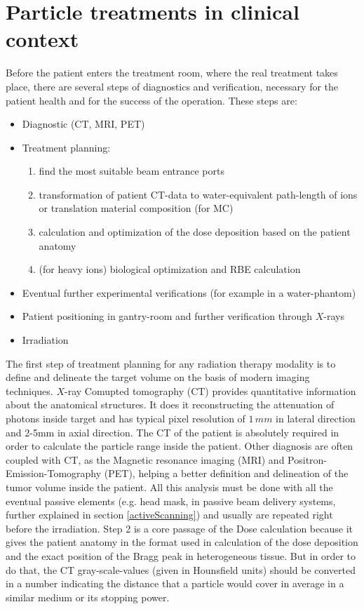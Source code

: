 \documentclass[12pt, a4paper, twoside]{book}
\begin{document}

\section{Particle treatments in clinical context}
Before the patient enters the treatment room, where the real treatment takes place, there are several steps of diagnostics and verification, necessary for the patient health and for the success of the operation.
These steps are:
\begin{itemize}
\item Diagnostic (CT, MRI, PET)
\item Treatment planning:
	\begin{enumerate}
	\item find the most suitable beam entrance ports
	\item transformation of patient CT-data to water-equivalent path-length of ions or translation material composition (for MC)
	\item calculation and optimization of the dose deposition based on the patient anatomy
	\item (for heavy ions) biological optimization and RBE calculation
	\end{enumerate}
\item Eventual further experimental verifications (for example in a water-phantom)
\item Patient positioning in gantry-room and further verification through $X$-rays
\item Irradiation
\end{itemize}
The first step of treatment planning for any radiation therapy modality is to define and delineate the target volume on the basis of modern imaging techniques. $X$-ray Comupted tomography (CT) provides quantitative information about the anatomical structures. It does it reconstructing the attenuation of photons inside target and has typical pixel resolution of $1\,mm$ in lateral direction and 2-5mm in axial direction. The CT of the patient is absolutely required in order to calculate the particle range inside the patient. Other diagnosis are often coupled with CT, as the Magnetic resonance imaging (MRI) and Positron-Emission-Tomography (PET), helping a better definition and delineation of the tumor volume inside the patient.
All this analysis must be done with all the eventual passive elements (e.g. head mask, in passive beam delivery systems, further explained in section \ref{activeScanning}) and usually are repeated right before the irradiation.
Step 2 is a core passage of the Dose calculation because it gives the patient anatomy in the format used in calculation of the dose deposition and the exact position of the Bragg peak in heterogeneous tissue.
But in order to do that, the CT gray-scale-values (given in Hounsfield units) should be converted in a number indicating the distance that a particle would cover in average in a similar medium or its stopping power.
\end{document}
